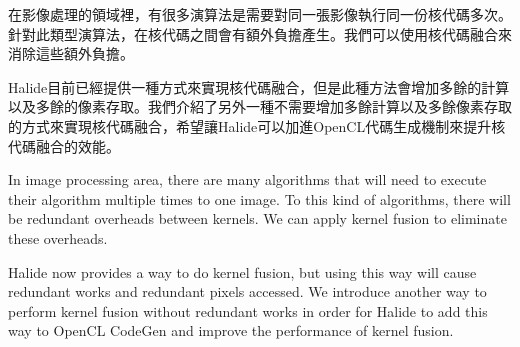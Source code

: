 \begin{abstractzh}
    在影像處理的領域裡，有很多演算法是需要對同一張影像執行同一份核代碼多次。針對此類型演算法，在核代碼之間會有額外負擔產生。我們可以使用核代碼融合來消除這些額外負擔。
    
    Halide目前已經提供一種方式來實現核代碼融合，但是此種方法會增加多餘的計算以及多餘的像素存取。我們介紹了另外一種不需要增加多餘計算以及多餘像素存取的方式來實現核代碼融合，希望讓Halide可以加進OpenCL代碼生成機制來提升核代碼融合的效能。
\end{abstractzh}

\begin{abstracten}
    In image processing area, there are many algorithms that will need to execute their algorithm multiple times to one image. To this kind of algorithms, there will be redundant overheads between kernels. We can apply kernel fusion to eliminate these overheads. 
    
    Halide now provides a way to do kernel fusion, but using this way will cause redundant works and redundant pixels accessed. We introduce another way to perform kernel fusion without redundant works in order for Halide to add this way to OpenCL CodeGen and improve the performance of kernel fusion.
\cleardoublepage
\end{abstracten}
\cleardoublepage
